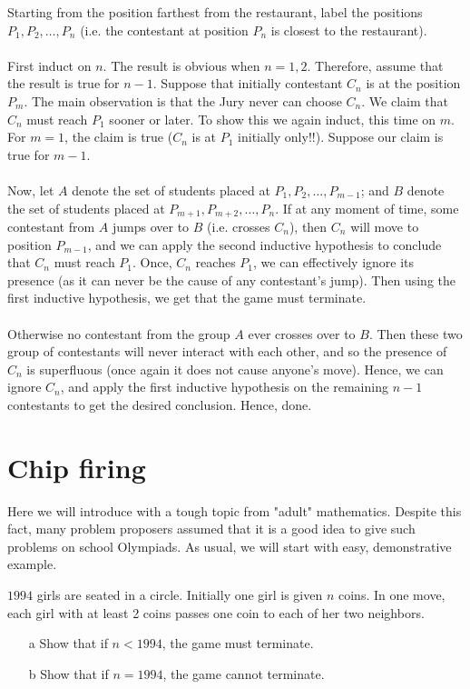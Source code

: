 \sol
Starting from the position farthest from the restaurant, label the positions $P_1,P_2, \dots ,P_n$ (i.e. the contestant at position $P_n$ is closest to the restaurant).
\\\\
 First induct on $n$. The result is obvious when $n=1,2$. Therefore, assume that the result is true for $n-1$. Suppose that initially contestant $C_n$ is at the position $P_m$. The main observation is that the Jury never can choose $C_n$. We claim that $C_n$ must reach $P_1$ sooner or later. To show this we again induct, this time on $m$. For $m=1$, the claim is true ($C_n$ is at $P_1$ initially only!!). Suppose our claim is true for $m-1$.
 \\\\
 Now, let $A$ denote the set of students placed at $P_1,P_2, \dots ,P_{m-1}$; and $B$ denote the set of students placed at $P_{m+1},P_{m+2}, \dots ,P_n$. If at any moment of time, some contestant from $A$ jumps over to $B$ (i.e. crosses $C_n$), then $C_n$ will move to position $P_{m-1}$, and we can apply the second inductive hypothesis to conclude that $C_n$ must reach $P_1$. Once, $C_n$ reaches $P_1$, we can effectively ignore its presence (as it can never be the cause of any contestant's jump). Then using the first inductive hypothesis, we get that the game must terminate.
\\\\
 Otherwise no contestant from the group $A$ ever crosses over to $B$. Then these two group of contestants will never interact with each other, and so the presence of $C_n$ is superfluous (once again it does not cause anyone's move). Hence, we can ignore $C_n$, and apply the first inductive hypothesis on the remaining $n-1$ contestants to get the desired conclusion. Hence, done. 

\section{Chip firing}

Here we will introduce with a tough topic from "adult" mathematics. Despite this fact, many problem proposers assumed that it is a good idea to give such problems on school Olympiads. As usual, we will start with easy, demonstrative example. 

\begin{example}[ISL 1994]
    $1994$ girls are seated in a circle. Initially one girl is given $n$ coins. In one move, each girl with at least 2 coins passes one coin to each of her two neighbors. 
    \begin{itemize}
        \item[a] Show that if $n<1994$, the game must terminate.
        \item[b] Show that if $n=1994$, the game cannot terminate.
    \end{itemize}
\end{example}


